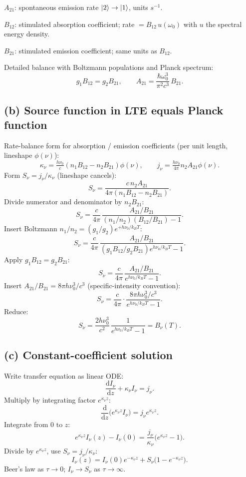 \documentclass[11pt]{article}
\newcommand{\de}{\mathrm{d}}
\begin{document}
$A_{21}$: spontaneous emission rate $\ket 2\to\ket 1$, units $\si{s^{-1}}$.

$B_{12}$: stimulated absorption coefficient; rate $=B_{12}\,u(\omega_0)$ with $u$ the spectral energy density.

$B_{21}$: stimulated emission coefficient; same units as $B_{12}$.

Detailed balance with Boltzmann populations and Planck spectrum:
\begin{equation}
\boxed{\;g_1 B_{12}=g_2 B_{21},\qquad A_{21}=\frac{\hbar\omega_0^3}{\pi^2 c^3}\,B_{21}.\;}
\label{eq:einstein}
\end{equation}

\subsection*{(b) Source function in LTE equals Planck function}

Rate-balance form for absorption / emission coefficients (per unit length, lineshape $\phi(\nu)$):
\[
\kappa_\nu=\tfrac{h\nu_0}{c}(n_1 B_{12}-n_2 B_{21})\phi(\nu),\qquad j_\nu=\tfrac{h\nu_0}{4\pi}n_2 A_{21}\phi(\nu).
\]
Form $S_\nu=j_\nu/\kappa_\nu$ (lineshape cancels):
\[
S_\nu=\frac{c\,n_2 A_{21}}{4\pi(n_1 B_{12}-n_2 B_{21})}.
\]
Divide numerator and denominator by $n_2 B_{21}$:
\[
S_\nu=\frac{c}{4\pi}\,\frac{A_{21}/B_{21}}{(n_1/n_2)(B_{12}/B_{21})-1}.
\]
Insert Boltzmann $n_1/n_2=(g_1/g_2)e^{+h\nu_0/k_B T}$:
\[
S_\nu=\frac{c}{4\pi}\,\frac{A_{21}/B_{21}}{(g_1 B_{12}/g_2 B_{21})e^{h\nu_0/k_B T}-1}.
\]
Apply $g_1 B_{12}=g_2 B_{21}$:
\[
S_\nu=\frac{c}{4\pi}\,\frac{A_{21}/B_{21}}{e^{h\nu_0/k_B T}-1}.
\]
Insert $A_{21}/B_{21}=8\pi h\nu_0^3/c^3$ (specific-intensity convention):
\[
S_\nu=\frac{c}{4\pi}\cdot\frac{8\pi h\nu_0^3/c^3}{e^{h\nu_0/k_B T}-1}.
\]
Reduce:
\begin{equation}
\boxed{\;S_\nu=\frac{2h\nu_0^3}{c^2}\,\frac{1}{e^{h\nu_0/k_B T}-1}=B_\nu(T).\;}
\label{eq:Kirchhoff}
\end{equation}

\subsection*{(c) Constant-coefficient solution}

Write transfer equation as linear ODE:
\[
\frac{\de I_\nu}{\de z}+\kappa_\nu I_\nu=j_\nu.
\]
Multiply by integrating factor $e^{\kappa_\nu z}$:
\[
\frac{\de}{\de z}\bigl(e^{\kappa_\nu z}I_\nu\bigr)=j_\nu e^{\kappa_\nu z}.
\]
Integrate from $0$ to $z$:
\[
e^{\kappa_\nu z}I_\nu(z)-I_\nu(0)=\frac{j_\nu}{\kappa_\nu}\bigl(e^{\kappa_\nu z}-1\bigr).
\]
Divide by $e^{\kappa_\nu z}$, use $S_\nu=j_\nu/\kappa_\nu$:
\begin{equation}
\boxed{\;I_\nu(z)=I_\nu(0)e^{-\kappa_\nu z}+S_\nu\bigl(1-e^{-\kappa_\nu z}\bigr).\;}
\label{eq:Isol}
\end{equation}
Beer's law as $\tau\to 0$; $I_\nu\to S_\nu$ as $\tau\to\infty$.
\end{document}
